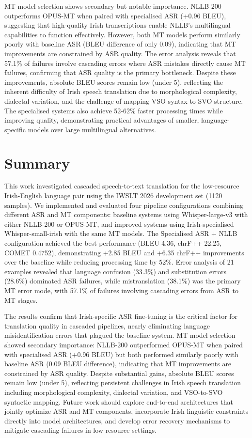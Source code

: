 \documentclass[11pt]{article}
\begin{document}
MT model selection shows secondary but notable importance. NLLB-200 outperforms OPUS-MT when paired with specialised ASR (+0.96 BLEU), suggesting that high-quality Irish transcriptions enable NLLB's multilingual capabilities to function effectively. However, both MT models perform similarly poorly with baseline ASR (BLEU difference of only 0.09), indicating that MT improvements are constrained by ASR quality. The error analysis reveals that 57.1\% of failures involve cascading errors where ASR mistakes directly cause MT failures, confirming that ASR quality is the primary bottleneck. Despite these improvements, absolute BLEU scores remain low (under 5), reflecting the inherent difficulty of Irish speech translation due to morphological complexity, dialectal variation, and the challenge of mapping VSO syntax to SVO structure. The specialised systems also achieve 52-62\% faster processing times while improving quality, demonstrating practical advantages of smaller, language-specific models over large multilingual alternatives.

\section{Summary}

This work investigated cascaded speech-to-text translation for the low-resource Irish-English language pair using the IWSLT 2026 development set (1120 samples). We implemented and evaluated four pipeline configurations combining different ASR and MT components: baseline systems using Whisper-large-v3 with either NLLB-200 or OPUS-MT, and improved systems using Irish-specialised Whisper-small-irish with the same MT models. The Specialised ASR + NLLB configuration achieved the best performance (BLEU 4.36, chrF++ 22.25, COMET 0.4752), demonstrating +2.85 BLEU and +6.35 chrF++ improvements over the baseline while reducing processing time by 52\%. Error analysis of 21 examples revealed that language confusion (33.3\%) and substitution errors (28.6\%) dominated ASR failures, while mistranslation (38.1\%) was the primary MT error mode, with 57.1\% of failures involving cascading errors from ASR to MT stages.

The results confirm that Irish-specific ASR fine-tuning is the critical factor for translation quality in cascaded pipelines, nearly eliminating language misidentification errors that plagued the baseline system. MT model selection showed secondary importance: NLLB-200 outperformed OPUS-MT when paired with specialised ASR (+0.96 BLEU) but both performed similarly poorly with baseline ASR (0.09 BLEU difference), indicating that MT improvements are constrained by ASR quality. Despite substantial gains, absolute BLEU scores remain low (under 5), reflecting persistent challenges in Irish speech translation including morphological complexity, dialectal variation, and VSO-to-SVO syntactic mapping. Future work should explore end-to-end architectures that jointly optimize ASR and MT components, incorporate Irish linguistic constraints directly into model architectures, and develop error recovery mechanisms to mitigate cascading failures in low-resource settings.
\end{document}

